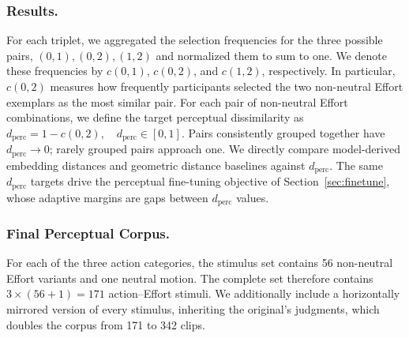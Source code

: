 \documentclass[letterpaper]{article} %
\begin{document}
\subsubsection{Results.}
For each triplet, we aggregated the selection frequencies for the three possible pairs, ${(0,1),(0,2),(1,2)}$ and normalized them to sum to one. We denote these frequencies by $c(0,1)$, $c(0,2)$, and $c(1,2)$, respectively. In particular, $c(0,2)$ measures how frequently participants selected the two non-neutral Effort exemplars as the most similar pair. For each pair of non-neutral Effort combinations, we define the target perceptual dissimilarity as $d_{\mathrm{perc}} = 1-c(0,2), \quad d_{\mathrm{perc}} \in [0,1].$
Pairs consistently grouped together have $d_{\mathrm{perc}}\rightarrow 0$; rarely grouped pairs approach one. We directly compare model-derived embedding distances and geometric distance baselines against $d_{\mathrm{perc}}$. The same $d_{\text{perc}}$ targets drive the perceptual fine-tuning objective of Section~\ref{sec:finetune}, whose adaptive margins are gaps between $d_{\text{perc}}$ values.




\subsubsection{Final Perceptual Corpus.}
For each of the three action categories, the stimulus set contains 56 non-neutral Effort variants and one neutral motion. The complete set therefore contains $3 \times (56+1) = 171$ action--Effort stimuli. We additionally include a horizontally mirrored version of every stimulus, inheriting the original's judgments, which doubles the corpus from 171 to 342 clips.
\end{document}
